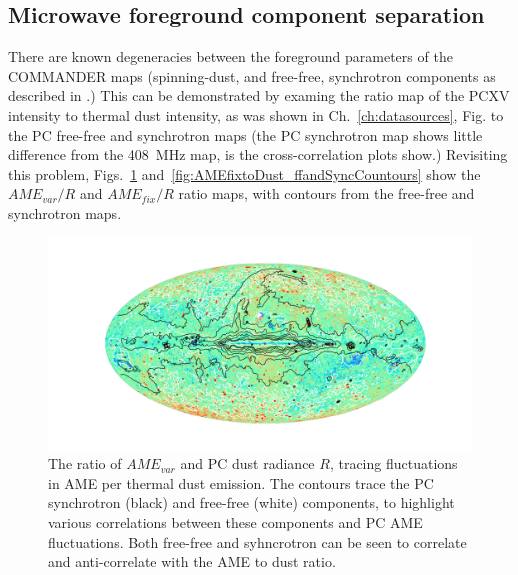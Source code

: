           \subsection{Microwave foreground component separation}
            There are known degeneracies between the foreground parameters of the COMMANDER maps (spinning-dust, and free-free, synchrotron components as described in \cite{planck15X}.) This can be demonstrated by examing the ratio map of the PCXV intensity to thermal dust intensity, as was shown in Ch.~\ref{ch:datasources}, Fig. to the PC free-free and synchrotron maps (the PC synchrotron map shows little difference from the \cite{haslam82} 408~MHz map, is the cross-correlation plots show.) Revisiting this problem, Figs.~\ref{fig:AMEvartoDust_ffandSyncCountours} and~\ref{fig:AMEfixtoDust_ffandSyncCountours} show the $AME_{var}/R$ and $AME_{fix}/R$ ratio maps, with contours from the free-free and synchrotron maps.
                \begin{figure}
                    \includegraphics[width=\textwidth]{../Plots/ch_allsky/AMEvartoDust_ffandSyncCountours.pdf}
                    \centering
                    \caption{The ratio of $AME_{var}$ and PC dust radiance $R$, tracing fluctuations in AME per thermal dust emission. The contours trace the PC synchrotron (black) and free-free (white) components, to highlight various correlations between these components and PC AME fluctuations. Both free-free and syhncrotron can be seen to correlate and anti-correlate with the AME to dust ratio.}
                    \label{fig:AMEvartoDust_ffandSyncCountours}
                \end{figure}
